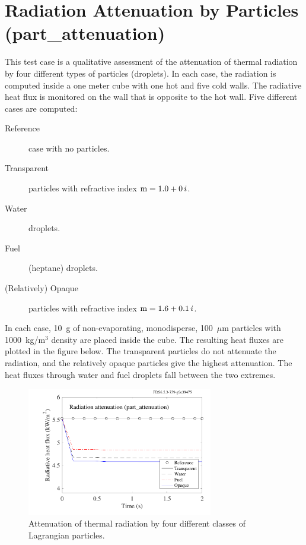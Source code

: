 \documentclass[11pt]{book}
\begin{document}
\clearpage

\section{Radiation Attenuation by Particles (\texorpdfstring{{\bf part\_attenuation}}{part\_attenuation}) }
\label{part_attenuation}

This test case is a qualitative assessment of the attenuation of thermal radiation by four different types of particles (droplets).
In each case, the radiation is computed inside a one meter cube with one hot and five cold walls.
The radiative heat flux is monitored on the wall that is opposite to the hot wall. Five different cases are computed:
\begin{description}
\item[Reference] case with no particles.
\item[Transparent] particles with refractive index $\hbox{m} = 1.0+0\,i$.
\item[Water] droplets.
\item[Fuel] (heptane) droplets.
\item[(Relatively) Opaque] particles with refractive index $\hbox{m} = 1.6+0.1 \,i$.
\end{description}
In each case, 10~g of non-evaporating, monodisperse, 100~$\mu$m particles with 1000~kg/m$^3$ density are placed inside the cube.  The resulting heat
fluxes are plotted in the figure below. The transparent particles do not attenuate the radiation, and the relatively opaque particles
give the highest attenuation. The heat fluxes through water and fuel droplets fall between the two extremes.
\begin{figure}[h]
\begin{center}
\includegraphics[width=3.2in]{SCRIPT_FIGURES/part_attenuation}
\end{center}
\caption[Radiation attenuation by Lagrangian particles.]{Attenuation of thermal radiation by four different classes of Lagrangian particles.}
\label{part_attenuation_figure}
\end{figure}
\end{document}
